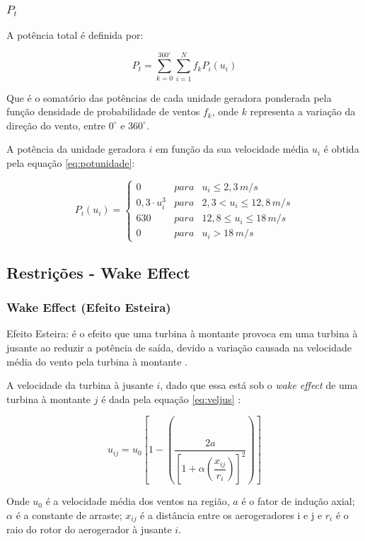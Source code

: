\documentclass{beamer}
\begin{document}
	\begin{frame}
		\frametitle{$ P_t $}
		A potência total é definida por:
		
		\begin{equation}\label{eq:pot}
			P_t = \sum_{k=0}^{360^{\circ}} \sum_{i=1}^{N} f_k P_i(u_i)
		\end{equation}
		
		Que é o somatório das potências de cada unidade geradora ponderada pela função densidade de probabilidade de ventos $ f_k $, onde $ k $ representa a variação da direção do vento, entre $ 0^{\circ} $ e $ 360^{\circ} $. 
		
		A potência da unidade geradora $ i $ em função da sua velocidade média $ u_i $ é obtida pela equação \ref{eq:potunidade}:
		
		\begin{equation}\label{eq:potunidade}
			P_i(u_i) = \left\{\begin{matrix}
				0 & para & u_i \leq 2,3 \, m/s\\ 
				0,3 \cdot u_i^{3} & para & 2,3 < u_i \leq 12,8 \, m/s\\ 
				630 & para & 12,8 \leq u_i \leq 18 \, m/s\\ 
				0 & para & u_i > 18 \, m/s
			\end{matrix}\right.
		\end{equation}
	\end{frame}

	\subsection{Restrições - Wake Effect}
	\begin{frame}
		\frametitle{Wake Effect (Efeito Esteira)}
		Efeito Esteira: é o efeito que uma turbina à montante provoca em uma turbina à jusante ao reduzir a potência de saída, devido a variação causada na velocidade média do vento pela turbina à montante \cite{FredericoFerreiraPanoeiro2018} \cite{pookpunt}. 
		
		A velocidade da turbina à jusante $ i $, dado que essa está sob o \textit{wake effect} de uma turbina à montante $ j $ é dada pela equação \ref{eq:veljus} \cite{pookpunt}:
		
		\begin{equation}\label{eq:veljus}
			u_{ij} = u_0 \left[1 - \left(\dfrac{2a}{\left[1 + \alpha\left(\dfrac{x_{ij}}{r_i}\right)\right]^2}\right)\right]
		\end{equation}
	
		Onde $ u_0 $ é a velocidade média dos ventos na região, $ a $ é o fator de indução axial; $ \alpha $ é a constante de arraste; $ x_{ij} $ é a distância entre os aerogeradores i e j e $ r_i $ é o raio do rotor do aerogerador à jusante $ i $.
	\end{frame}
\end{document}
